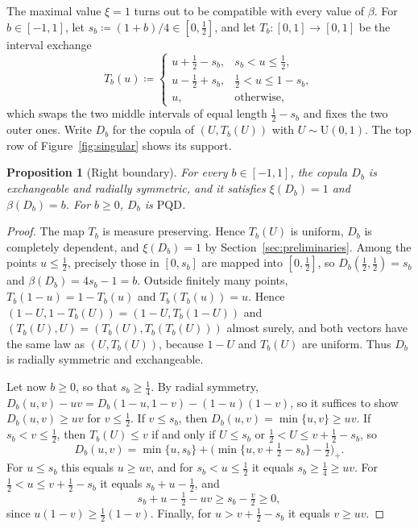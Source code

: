 \documentclass[twocolumn,a4paper]{article}
\numberwithin{equation}{section}
\newtheorem{proposition}[theorem]{Proposition}
\theoremstyle{remark}
\newcommand{\1}{\mathbf{1}}
\newcommand{\PQD}{\mathrm{PQD}}
\begin{document}
The maximal value \(\xi=1\) turns out to be compatible with every value of \(\beta\).
For \(b\in[-1,1]\), let \(s_b\coloneqq(1+b)/4\in[0,\tfrac12]\), and let \(T_b\colon[0,1]\to[0,1]\) be the interval exchange
\[
T_b(u)\coloneqq
\begin{cases}
u+\tfrac12-s_b,&s_b<u\le\tfrac12,\\
u-\tfrac12+s_b,&\tfrac12<u\le1-s_b,\\
u,&\text{otherwise},
\end{cases}
\]
which swaps the two middle intervals of equal length \(\tfrac12-s_b\) and fixes the two outer ones.
Write \(D_b\) for the copula of \((U,T_b(U))\) with \(U\sim\mathrm{U}(0,1)\).
The top row of Figure~\ref{fig:singular} shows its support.

\begin{proposition}[Right boundary]\label{prop:right-boundary}
For every \(b\in[-1,1]\), the copula \(D_b\) is exchangeable and radially symmetric, and it satisfies \(\xi(D_b)=1\) and \(\beta(D_b)=b\).
For \(b\ge0\), \(D_b\) is \(\PQD\).
\end{proposition}

\begin{proof}
The map \(T_b\) is measure preserving.
Hence \(T_b(U)\) is uniform, \(D_b\) is completely dependent, and \(\xi(D_b)=1\) by Section~\ref{sec:preliminaries}.
Among the points \(u\le\tfrac12\), precisely those in \([0,s_b]\) are mapped into \([0,\tfrac12]\), so \(D_b(\tfrac12,\tfrac12)=s_b\) and \(\beta(D_b)=4s_b-1=b\).
Outside finitely many points, \(T_b(1-u)=1-T_b(u)\) and \(T_b(T_b(u))=u\).
Hence \((1-U,1-T_b(U))=(1-U,T_b(1-U))\) and \((T_b(U),U)=(T_b(U),T_b(T_b(U)))\) almost surely, and both vectors have the same law as \((U,T_b(U))\), because \(1-U\) and \(T_b(U)\) are uniform.
Thus \(D_b\) is radially symmetric and exchangeable.

Let now \(b\ge0\), so that \(s_b\ge\tfrac14\).
By radial symmetry, \(D_b(u,v)-uv=D_b(1-u,1-v)-(1-u)(1-v)\), so it suffices to show \(D_b(u,v)\ge uv\) for \(v\le\tfrac12\).
If \(v\le s_b\), then \(D_b(u,v)=\min\{u,v\}\ge uv\).
If \(s_b<v\le\tfrac12\), then \(T_b(U)\le v\) if and only if \(U\le s_b\) or \(\tfrac12<U\le v+\tfrac12-s_b\), so
\[
D_b(u,v)=\min\{u,s_b\}+\bigl(\min\{u,v+\tfrac12-s_b\}-\tfrac12\bigr)_+.
\]
For \(u\le s_b\) this equals \(u\ge uv\), and for \(s_b<u\le\tfrac12\) it equals \(s_b\ge\tfrac14\ge uv\).
For \(\tfrac12<u\le v+\tfrac12-s_b\) it equals \(s_b+u-\tfrac12\), and
\[
s_b+u-\tfrac12-uv\ge s_b-\tfrac v2\ge0,
\]
since \(u(1-v)\ge\tfrac12(1-v)\).
Finally, for \(u>v+\tfrac12-s_b\) it equals \(v\ge uv\).
\end{proof}
\end{document}
